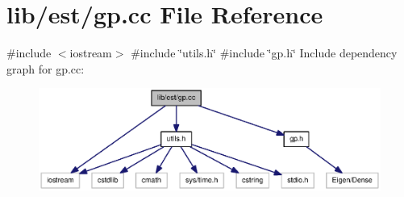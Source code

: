 \section{lib/est/gp.cc \-File \-Reference}
\label{gp_8cc}
{\ttfamily \#include $<$iostream$>$}\*
{\ttfamily \#include \char`\"{}utils.\-h\char`\"{}}\*
{\ttfamily \#include \char`\"{}gp.\-h\char`\"{}}\*
\-Include dependency graph for gp.\-cc\-:\nopagebreak
\begin{figure}[H]
\begin{center}
\leavevmode
\includegraphics[width=350pt]{gp_8cc__incl}
\end{center}
\end{figure}
